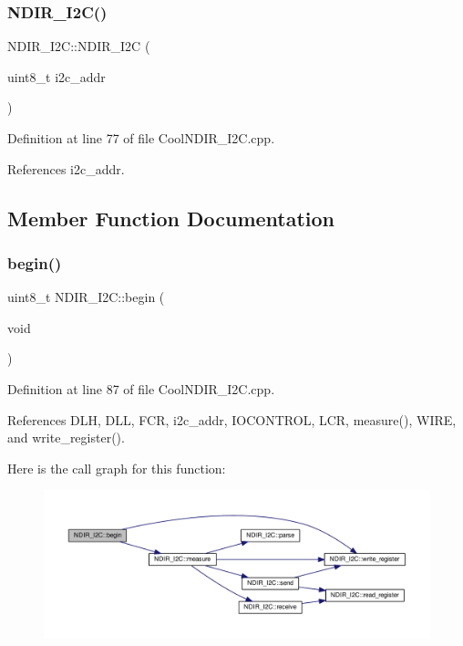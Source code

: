 \subsubsection{\texorpdfstring{N\+D\+I\+R\+\_\+\+I2\+C()}{NDIR\_I2C()}}
{\footnotesize\ttfamily N\+D\+I\+R\+\_\+\+I2\+C\+::\+N\+D\+I\+R\+\_\+\+I2C (\begin{DoxyParamCaption}\item[{uint8\+\_\+t}]{i2c\+\_\+addr }\end{DoxyParamCaption})}



Definition at line 77 of file Cool\+N\+D\+I\+R\+\_\+\+I2\+C.\+cpp.



References i2c\+\_\+addr.



\subsection{Member Function Documentation}
\mbox{\label{class_n_d_i_r___i2_c_acf82f3dcb41e75709a93f8b68d087a3c}} 
\subsubsection{\texorpdfstring{begin()}{begin()}}
{\footnotesize\ttfamily uint8\+\_\+t N\+D\+I\+R\+\_\+\+I2\+C\+::begin (\begin{DoxyParamCaption}\item[{void}]{ }\end{DoxyParamCaption})}



Definition at line 87 of file Cool\+N\+D\+I\+R\+\_\+\+I2\+C.\+cpp.



References D\+LH, D\+LL, F\+CR, i2c\+\_\+addr, I\+O\+C\+O\+N\+T\+R\+OL, L\+CR, measure(), W\+I\+RE, and write\+\_\+register().

Here is the call graph for this function\+:\nopagebreak
\begin{figure}[H]
\begin{center}
\leavevmode
\includegraphics[width=350pt]{d6/ddb/class_n_d_i_r___i2_c_acf82f3dcb41e75709a93f8b68d087a3c_cgraph}
\end{center}
\end{figure}
\mbox{\label{class_n_d_i_r___i2_c_ab8f50d38501d498b802b822bd4844ede}} 
